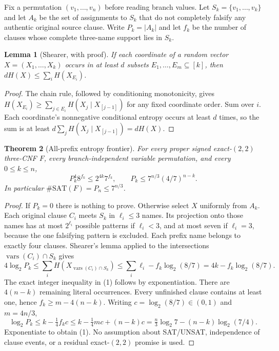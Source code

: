 \documentclass[11pt]{article}
\newtheorem{theorem}{Theorem}
\newtheorem{lemma}[theorem]{Lemma}
\begin{document}
Fix a permutation $(v_1,\ldots,v_n)$ before reading branch values. Let
$S_k=\{v_1,\ldots,v_k\}$ and let $A_k$ be the set of assignments to $S_k$
that do not completely falsify any authentic original source clause.
Write $P_k=|A_k|$ and let $f_k$ be the number of clauses whose complete
three-name support lies in $S_k$.

\begin{lemma}[Shearer, with proof]
If each coordinate of a random vector $X=(X_1,\ldots,X_k)$ occurs in
at least $d$ subsets $E_1,\ldots,E_m\subseteq[k]$, then
$dH(X)\le\sum_i H(X_{E_i})$.
\end{lemma}
\begin{proof}
The chain rule, followed by conditioning monotonicity, gives
$H(X_{E_i})\ge\sum_{j\in E_i}H(X_j\mid X_{[j-1]})$ for any fixed
coordinate order. Sum over $i$. Each coordinate's nonnegative
conditional entropy occurs at least $d$ times, so the sum is at least
$d\sum_j H(X_j\mid X_{[j-1]})=dH(X)$.
\end{proof}

\begin{theorem}[All-prefix entropy frontier]\label{t:entropy}
For every proper signed exact-$(2,2)$ three-CNF $F$, every
branch-independent variable permutation, and every $0\le k\le n$,
\[
\boxed{P_k^4 8^{f_k}\le 2^{4k}7^{f_k}},\qquad
\boxed{P_k\le 7^{n/3}(4/7)^{n-k}}.
\tag{1}
\]
In particular $\#\mathrm{SAT}(F)=P_n\le7^{n/3}$.
\end{theorem}
\begin{proof}
If $P_k=0$ there is nothing to prove. Otherwise select $X$ uniformly
from $A_k$. Each original clause $C_i$ meets $S_k$ in $\ell_i\le3$
names. Its projection onto those names has at most $2^{\ell_i}$
possible patterns if $\ell_i<3$, and at most seven if $\ell_i=3$,
because the one falsifying pattern is excluded. Each prefix name
belongs to exactly four clauses. Shearer's lemma applied to the
intersections $\operatorname{vars}(C_i)\cap S_k$ gives
\[
4\log_2P_k \le\sum_i H(X_{\operatorname{vars}(C_i)\cap S_k})
\le \sum_i\ell_i-f_k\log_2(8/7)
=4k-f_k\log_2(8/7).
\]
The exact integer inequality in (1) follows by exponentiation.
There are $4(n-k)$ remaining literal occurrences. Every unfinished
clause contains at least one, hence
$f_k\ge m-4(n-k)$. Writing $c=\log_2(8/7)\in(0,1)$ and $m=4n/3$,
\[
\log_2P_k\le k-\tfrac14 f_k c
\le k-\tfrac14mc+(n-k)c
=\tfrac n3\log_2 7-(n-k)\log_2(7/4).
\]
Exponentiate to obtain (1). No assumption about SAT/UNSAT,
independence of clause events, or a residual exact-$(2,2)$ promise is used.
\end{proof}
\end{document}
